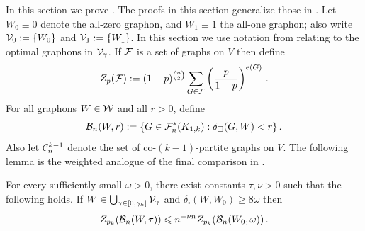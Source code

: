 In this section we prove . The proofs in this section generalize those in \cite{perkins2025typical}. Let $W_0\equiv0$ denote the all-zero graphon, and $W_1\equiv1$ the all-one graphon; also write ${\mathcal V}_0:=\{W_0\}$ and ${\mathcal V}_1:=\{W_1\}$. In this section we use notation from  relating to the optimal graphons in ${\mathcal V}_\gamma$. If ${\mathcal F}$ is a set of graphs on $V$ then define
$$Z_p({\mathcal F}):=(1-p)^{\binom n2}\sum_{G\in{\mathcal F}}\left(\frac{p}{1-p}\right)^{e(G)}\,.$$
For all graphons $W\in{\mathcal W}$ and all $r>0$, define
$${\mathcal B}_n(W,r):=\{G\in{\mathcal F}^\ast_n(K_{1,k}):\delta_\square(G,W)<r\}\,.$$
Also let ${\mathcal C}^{k-1}_n$ denote the set of co-$(k-1)$-partite graphs on $V$. The following lemma is the weighted analogue of the final comparison in .

\begin{lemma}\label{lemma:critical-gnp-comparison-K1k}
For every sufficiently small $\omega>0$, there exist constants $\tau,\nu>0$ such that the following holds. If $W\in\bigcup_{\gamma\in[0,\gamma_k]}{\mathcal V}_\gamma$ and $\delta_\square(W,W_0)\geq8\omega$ then
$$Z_{p_k}({\mathcal B}_n(W,\tau))\leqslant n^{-\nu n}Z_{p_k}({\mathcal B}_n(W_0,\omega))\,.$$
\end{lemma}
